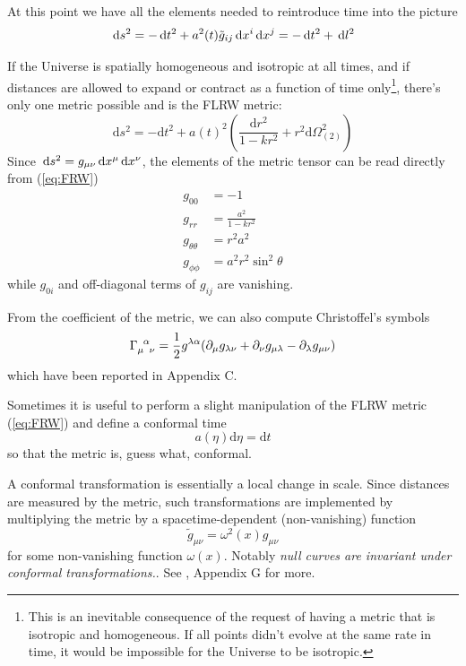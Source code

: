 \par At this point we have all the elements needed to reintroduce time into the picture
\begin{equation}
    \,\text{d}s^{2} = -\,\text{d}t^{2}+a^{2}(t)\tilde{g}_{ij}\,\text{d}x^{i}\,\text{d}x^{j} = -\,\text{d}t^{2}+\,\text{d}l^{2}
\end{equation}
\par If the Universe is spatially homogeneous and isotropic at all times, and if distances are allowed to expand or contract as a function of time only\footnote{This is an inevitable consequence of the request of having a metric that is isotropic and homogeneous. If all points didn't evolve at the same rate in time, it would be impossible for the Universe to be isotropic.}, there's only one metric possible and is the FLRW metric:
\begin{equation}
    \boxed{
    \text{d}s^{2} = -\text{d}t^{2}+a(t)^{2}\left(\frac{\text{d}r^{2}}{1-kr^{2}}+r^{2}\text{d}\Omega_{(2)}^{2}\right)
    }
    \label{eq:FRW}
\end{equation}
Since $\,\text{d}s^{2} = g_{\mu\nu}\,\text{d}x^{\mu}\,\text{d}x^{\nu}$, the elements of the metric tensor can be read directly from (\ref{eq:FRW})
\begin{align*}
    g_{00} &= -1\\
    g_{rr} &= \frac{a^{2}}{1-kr^{2}}\\
    g_{\theta\theta} &= r^{2}a^{2}\\
    g_{\phi\phi} &= a^{2}r^{2}\sin^{2}\theta
\end{align*}
while $g_{0i}$ and off-diagonal terms of $g_{ij}$ are vanishing.
\par From the coefficient of the metric, we can also compute Christoffel's symbols
\begin{equation}
    \Gamma_{\mu\;\;\nu}^{\;\;\alpha} = \frac{1}{2}g^{\lambda\alpha}(\partial_{\mu}g_{\lambda\nu}+\partial_{\nu}g_{\mu\lambda}-\partial_{\lambda}g_{\mu\nu})
    \label{eq:christoffel}
\end{equation}
which have been reported in Appendix C.
\par Sometimes it is useful to perform a slight manipulation of the FLRW metric (\ref{eq:FRW}) and define a conformal time 
\begin{equation}
    a(\eta)\text{d}\eta = \text{d}t
    \label{eq:conformaltime}
\end{equation}
so that the metric is, guess what, conformal.
\begin{tcolorbox}[enhanced,attach boxed title to top center={yshift=-3mm,yshifttext=-1mm},
  colback=blue!5!white,colframe=blue!75!black,colbacktitle=blue!80!black,
  title=Conformal Metric and Transformations,
  boxed title style={size=small,colframe=blue!50!black}]
  A conformal transformation is essentially a local change in scale. Since distances are measured by the metric, such transformations are implemented by multiplying the metric by a spacetime-dependent (non-vanishing) function
  $$ \tilde{g}_{\mu\nu} = \omega^{2}(x)g_{\mu\nu} $$
  for some non-vanishing function $\omega(x)$. Notably \emph{null curves are invariant under conformal transformations.}. See \cite{carroll}, Appendix G for more.
\end{tcolorbox}
